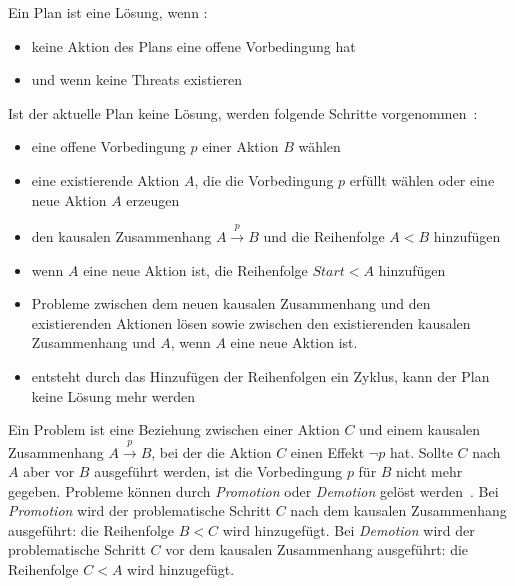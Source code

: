 Ein Plan ist eine Lösung, wenn \cite{grastien}:
\begin{itemize}
    \item keine Aktion des Plans eine offene Vorbedingung hat
    \item und wenn keine Threats existieren
\end{itemize}
Ist der aktuelle Plan keine Lösung, werden folgende Schritte vorgenommen~\cite{grastien}:
\begin{itemize}
    \item eine offene Vorbedingung $p$ einer Aktion $B$ wählen
    \item eine existierende Aktion $A$, die die Vorbedingung $p$ erfüllt wählen oder eine neue Aktion $A$ erzeugen
    \item den kausalen Zusammenhang $A \xrightarrow{p} B$ und die Reihenfolge $A < B$ hinzufügen
    \item wenn $A$ eine neue Aktion ist, die Reihenfolge $Start < A$ hinzufügen
    \item Probleme zwischen dem neuen kausalen Zusammenhang und den existierenden Aktionen lösen sowie zwischen den existierenden kausalen Zusammenhang und $A$, wenn $A$ eine neue Aktion ist.
    \item entsteht durch das Hinzufügen der Reihenfolgen ein Zyklus, kann der Plan keine Lösung mehr werden
\end{itemize}
Ein Problem ist eine Beziehung zwischen einer Aktion $C$ und einem kausalen Zusammenhang  $A \xrightarrow{p} B$, bei der die Aktion $C$ einen Effekt $\neg p$ hat.
Sollte $C$ nach $A$ aber vor $B$ ausgeführt werden, ist die Vorbedingung $p$ für $B$ nicht mehr gegeben.
Probleme können durch \emph{Promotion} oder \emph{Demotion} gelöst werden~\cite{dyer_2003}.
Bei \emph{Promotion} wird der problematische Schritt $C$ nach dem kausalen Zusammenhang ausgeführt: die Reihenfolge $B < C$ wird hinzugefügt.
Bei \emph{Demotion} wird der problematische Schritt $C$ vor dem kausalen Zusammenhang ausgeführt: die Reihenfolge $C < A$ wird hinzugefügt.


